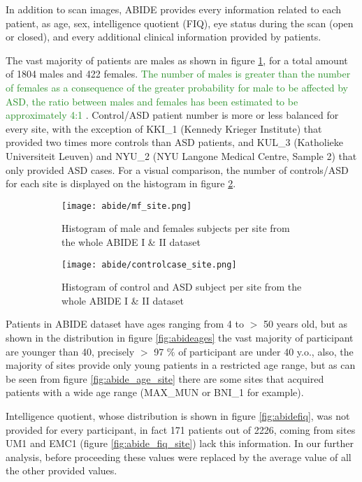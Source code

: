 \documentclass[11pt]{report}
\begin{document}
In addition to scan images, ABIDE provides every information related to each patient, as age, sex, intelligence quotient (FIQ), eye status during the scan (open or closed), and every additional clinical information provided by patients.

The vast majority of patients are males as shown in figure \ref{fig:mf_site}, for a total amount of 1804 males and 422 females.
\textcolor{ForestGreen}{The number of males is greater than the number of females as a consequence of the greater probability for male to be affected by ASD, the ratio between males and females has been estimated to be approximately 4:1 \cite{fombonne2009}}.
Control/ASD patient number is more or less balanced for every site, with the exception of KKI\_1 (Kennedy Krieger Institute) that provided two times more controls than ASD patients, and KUL\_3 (Katholieke Universiteit Leuven) and NYU\_2 (NYU Langone Medical Centre, Sample 2) that only provided ASD cases. For a visual comparison, the number of controls/ASD for each site is displayed on the histogram in figure \ref{fig:controlcase_site}.

\begin{figure}[h]
\centering
\begin{subfigure}{0.9\textwidth}
\texttt{[image: abide/mf\_site.png]}
\caption{Histogram of male and females subjects per site from the whole ABIDE I \& II dataset}
\label{fig:mf_site}
\end{subfigure}
\begin{subfigure}{0.9\textwidth}
\texttt{[image: abide/controlcase\_site.png]}
\caption{Histogram of control and ASD subject per site from the whole ABIDE I \& II dataset}
\label{fig:controlcase_site}
\end{subfigure}
\caption{}
\label{}
\end{figure}


Patients in ABIDE dataset have ages ranging from 4 to $>$ 50 years old, but as shown in the distribution in figure \ref{fig:abideages} the vast majority of participant are younger than 40, precisely $>$ 97 $\%$ of participant are under 40 y.o., also, the majority of sites provide only young patients in a restricted age range, but  as can be seen from figure \ref{fig:abide_age_site} there are some sites that acquired patients with a wide age range (MAX\_MUN or BNI\_1 for example).


Intelligence quotient, whose distribution is shown in figure \ref{fig:abidefiq}, was not provided for every participant, in fact 171 patients out of 2226, coming from sites UM1 and EMC1 (figure \ref{fig:abide_fiq_site}) lack this information.
In our further analysis, before proceeding these values were replaced by the average value of all the other provided values.
\end{document}
